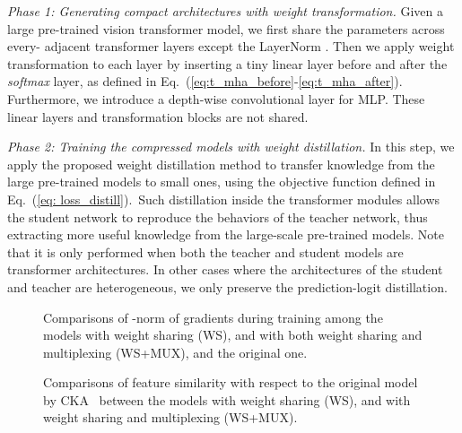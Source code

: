 \documentclass[10pt,twocolumn,letterpaper]{article}
\begin{document}
\textit{Phase 1: Generating compact architectures with weight transformation.} Given a large pre-trained vision transformer model, we first share the parameters across every- adjacent transformer layers except the LayerNorm \cite{LN}. Then we apply weight transformation to each layer by inserting a tiny linear layer before and after the \emph{softmax} layer, as defined in Eq.~(\ref{eq:t_mha_before}-\ref{eq:t_mha_after}). Furthermore, we introduce a depth-wise convolutional layer for MLP. These linear layers and transformation blocks are not shared.

\textit{Phase 2: Training the compressed models with weight distillation.} In this step, we apply the proposed weight distillation method to transfer knowledge from the large pre-trained models to small ones, using the objective function defined in Eq.~(\ref{eq: loss_distill}).~Such distillation inside the transformer modules allows the student network to reproduce the behaviors of the teacher network\cite{tinybert}, thus extracting more useful knowledge from the large-scale pre-trained models. Note that it is only performed when both the teacher and student models are transformer architectures. In other cases where the architectures of the student and teacher are heterogeneous, we only preserve the prediction-logit distillation. 

     \begin{figure}[t]
     \vspace{-3mm}
        \centering
        \hspace{-5mm}
        \centering
    \vspace{-4mm}
        \caption {
        Comparisons of -norm of gradients during training among the models with weight sharing (WS), and with both weight sharing and multiplexing (WS+MUX), and the original one. 
        }
        \vspace{-2mm}
    
        \label {fig:grad_norm}
    \end{figure}
    
    \begin{figure}[t]
        \centering
        \hspace{-3mm}
        \centering
     \vspace{-4mm}
        \caption {
        Comparisons of feature similarity with respect to the original model by CKA~\cite{cka} between the models with weight sharing (WS), and with weight sharing and multiplexing (WS+MUX).
        }
        \vspace{-5mm}
    
        \label {fig:feat_cka}
    \end{figure}
    
\end{document}

